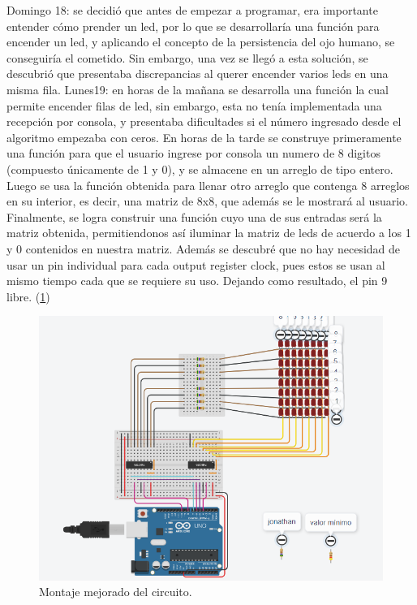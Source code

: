 \documentclass{article}
\begin{document}
Domingo 18: se decidió que antes de empezar a programar, era importante entender cómo prender un led, por lo que se desarrollaría una función para encender un led, y aplicando el concepto de la persistencia del ojo humano, se conseguiría el cometido. Sin embargo, una vez se llegó a esta solución, se descubrió que presentaba discrepancias al querer encender varios leds en una misma fila. 
\newline
Lunes19: en horas de la mañana se desarrolla una función la cual permite encender filas de led, sin embargo, esta no tenía implementada una recepción por consola, y presentaba dificultades si el número ingresado desde el algoritmo empezaba con ceros.
 En horas de la tarde se construye primeramente una función para que el usuario ingrese por consola un numero de 8 digitos (compuesto únicamente de 1 y 0), y se almacene en un arreglo de tipo entero. Luego se usa la función obtenida para  llenar otro arreglo que contenga 8 arreglos en su interior, es decir, una matriz de 8x8, que además se le mostrará al usuario.
 Finalmente, se logra construir una función cuyo una de sus entradas será la matriz obtenida, permitiendonos así iluminar la matriz de leds de acuerdo a los 1 y 0 contenidos en nuestra matriz.
 Además se descubré que no hay necesidad de usar un pin individual para cada output register clock, pues estos se usan al mismo tiempo cada que se requiere su uso. Dejando como resultado, el pin 9 libre. (\ref{fig:montaje2})
 
 \begin{figure}[h]
\includegraphics[scale=0.5]{montaje2.png}
\centering
\caption{Montaje mejorado del circuito.}
\label{fig:montaje2}
\end{figure}
 
\end{document}
